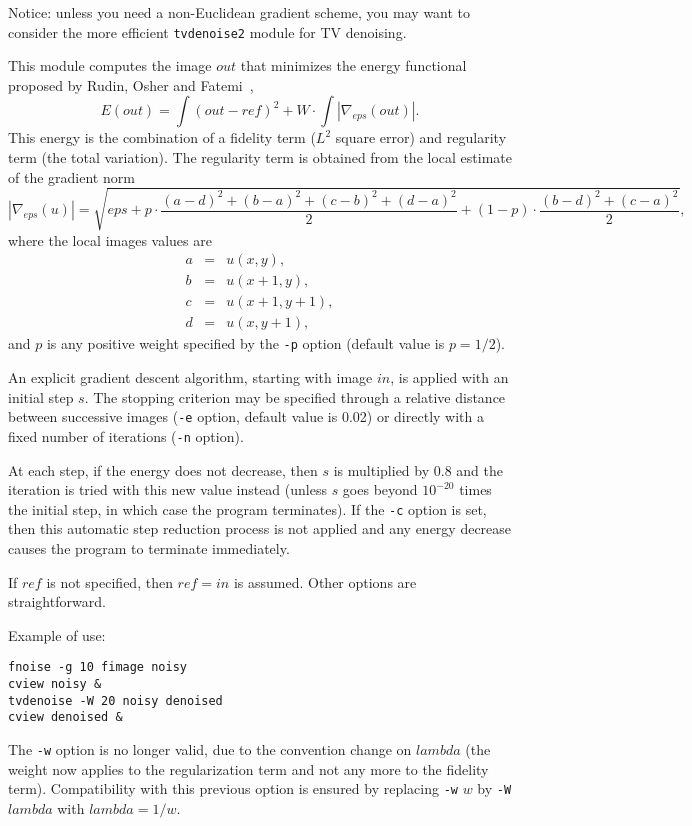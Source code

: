 Notice: unless you need a non-Euclidean gradient scheme,
you may want to consider the more efficient \verb+tvdenoise2+ module
for TV denoising.

\medskip

This module computes the image $out$ that minimizes the energy
functional proposed by Rudin, Osher and 
Fatemi~\cite{rudin.osher.ea:nonlinear}\cite{rudin.osher:total},
$$E(out) = \int (out -ref)^2 + W \cdot \int |\nabla_{eps}(out)|.$$
This energy is the combination of a fidelity term ($L^2$ square error)
and regularity term (the total variation).
The regularity term is obtained from the local estimate of the gradient norm
$$|\nabla_{eps}(u)| = \sqrt{eps + p \cdot 
\frac{\displaystyle (a-d)^2+(b-a)^2+(c-b)^2+(d-a)^2}2
+ (1-p)\cdot \frac{\displaystyle (b-d)^2+(c-a)^2}2},$$
where the local images values are 
\begin{eqnarray*}
a &=& u(x,y), \\
b &=& u(x+1,y), \\
c &=& u(x+1,y+1), \\
d &=& u(x,y+1),
\end{eqnarray*}
and $p$ is any positive weight specified by the \verb+-p+ option (default
value is $p=1/2$).

\medskip

An explicit 
gradient descent algorithm, starting with image $in$, is applied with an 
initial step $s$.
The stopping criterion may be specified through a relative distance
between successive images (\verb+-e+ option, default value is 0.02)
or directly with a fixed number of iterations (\verb+-n+ option).

\medskip

At each step, if the energy does not decrease, then $s$ is multiplied by
$0.8$ and the iteration is tried with this new value instead (unless
$s$ goes beyond $10^{-20}$ times the initial step, in which case the
program terminates). If the \verb+-c+ option is set, then this automatic
step reduction process is not applied and any energy decrease
causes the program to terminate immediately.

\medskip

If $ref$ is not specified, then $ref=in$ is assumed. 
Other options are straightforward.

\medskip

Example of use:
\begin{verbatim}
fnoise -g 10 fimage noisy
cview noisy &
tvdenoise -W 20 noisy denoised
cview denoised &
\end{verbatim}


\medskip

The \verb+-w+ option is no longer valid, due to the convention change on
$lambda$ (the weight now applies to the regularization term and not any more
to the fidelity term). Compatibility with this previous option is ensured
by replacing \verb+-w+ $w$ by \verb+-W+ $lambda$ with $lambda=1/w$.
